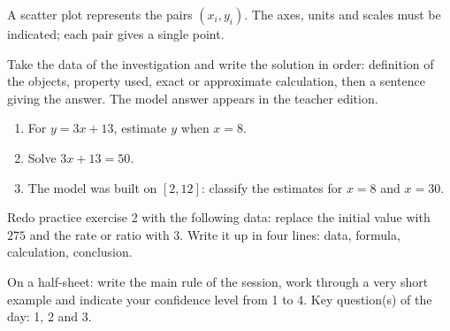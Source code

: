 \begin{traceecrite}A scatter plot represents the pairs $(x_i,y_i)$. The axes, units and scales must be indicated; each pair gives a single point.\end{traceecrite}

\begin{exemple}
Take the data of the investigation and write the solution in order: definition of the objects, property used, exact or approximate calculation, then a sentence giving the answer. The model answer appears in the teacher edition.
\end{exemple}

\begin{exercice}[-- essential]
\begin{enumerate}\item For $y=3x+13$, estimate $y$ when $x=8$.\item Solve $3x+13=50$.\item The model was built on $[2,12]$: classify the estimates for $x=8$ and $x=30$.\end{enumerate}
\end{exercice}


\begin{dm}Redo practice exercise 2 with the following data: replace the initial value with $275$ and the rate or ratio with $3$. Write it up in four lines: data, formula, calculation, conclusion.\end{dm}

\begin{sortie}On a half-sheet: write the main rule of the session, work through a very short example and indicate your confidence level from 1 to 4. Key question(s) of the day: 1, 2 and 3.\end{sortie}

